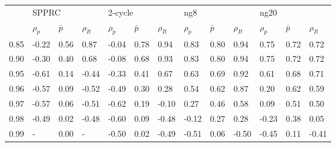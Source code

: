 \begin{tabular}{lllllllllllll}
\toprule
{} & \multicolumn{3}{l}{SPPRC} & \multicolumn{3}{l}{2-cycle} & \multicolumn{3}{l}{ng8} & \multicolumn{3}{l}{ng20} \\
{} & $\rho_p$ & $\bar p$ & $\rho_{It}$ & $\rho_p$ & $\bar p$ & $\rho_{It}$ & $\rho_p$ & $\bar p$ & $\rho_{It}$ & $\rho_p$ & $\bar p$ & $\rho_{It}$ \\
\midrule
0.85 &    -0.22 &     0.56 &     0.87 &    -0.04 &     0.78 &     0.94 &     0.83 &     0.80 &     0.94 &     0.75 &     0.72 &     0.72 \\
0.90 &    -0.30 &     0.40 &     0.68 &    -0.08 &     0.68 &     0.93 &     0.83 &     0.80 &     0.94 &     0.75 &     0.72 &     0.72 \\
0.95 &    -0.61 &     0.14 &    -0.44 &    -0.33 &     0.41 &     0.67 &     0.63 &     0.69 &     0.92 &     0.61 &     0.68 &     0.71 \\
0.96 &    -0.57 &     0.09 &    -0.52 &    -0.49 &     0.30 &     0.28 &     0.54 &     0.62 &     0.87 &     0.20 &     0.62 &     0.59 \\
0.97 &    -0.57 &     0.06 &    -0.51 &    -0.62 &     0.19 &    -0.10 &     0.27 &     0.46 &     0.58 &     0.09 &     0.51 &     0.50 \\
0.98 &    -0.49 &     0.02 &    -0.48 &    -0.60 &     0.09 &    -0.48 &    -0.12 &     0.27 &     0.28 &    -0.23 &     0.38 &     0.05 \\
0.99 &        - &     0.00 &        - &    -0.50 &     0.02 &    -0.49 &    -0.51 &     0.06 &    -0.50 &    -0.45 &     0.11 &    -0.41 \\
\bottomrule
\end{tabular}
